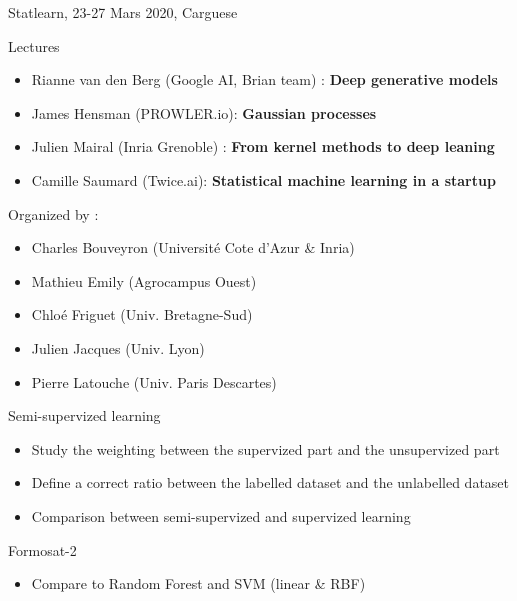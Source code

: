 \documentclass[aspectratio=1610,usenames,dvipsnames]{beamer}
\begin{document}
\begin{frame}{Statlearn, 23-27 Mars 2020, Carguese}
    \begin{block}{Lectures}
        \begin{itemize}
            \item  Rianne van den Berg (Google AI, Brian team) : \textbf{Deep generative models}
            \item James Hensman (PROWLER.io): \textbf{Gaussian processes}
            \item Julien Mairal (Inria Grenoble) : \textbf{From kernel methods to deep leaning}
            \item Camille Saumard (Twice.ai): \textbf{Statistical machine learning in a startup}
        \end{itemize}
    \end{block}
    \begin{block}{Organized by :}
        \begin{itemize}
            \item Charles Bouveyron (Université Cote d’Azur \& Inria)
            \item Mathieu Emily (Agrocampus Ouest)
            \item Chloé Friguet (Univ. Bretagne-Sud)
            \item Julien Jacques (Univ. Lyon)
            \item Pierre Latouche (Univ. Paris Descartes)
        \end{itemize}
        
    \end{block}



    
\end{frame}

\begin{frame}{Semi-supervized learning}
\begin{itemize}
    \item Study the weighting between the supervized part and the unsupervized part
    \item Define a correct ratio between the labelled dataset and the unlabelled dataset
    \item Comparison between semi-supervized and supervized learning
\end{itemize}
    
\end{frame}

\begin{frame}{Formosat-2}

    \begin{itemize}
        \item Compare to Random Forest and SVM (linear \& RBF)
    \end{itemize}

    
\end{frame}
\end{document}
